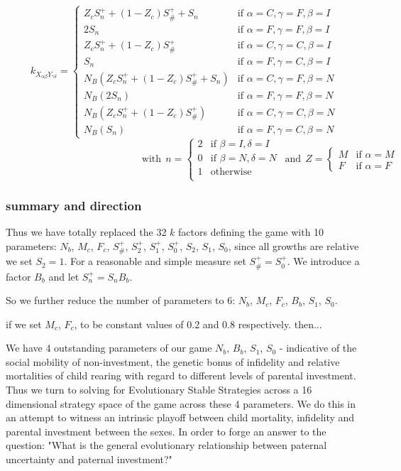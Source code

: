 \documentclass[journal,article,accept,oneauthors,pdftex,10pt,a4paper]{mdpi}
\begin{document}
$$ k_{X_{\alpha\beta}Y_{\gamma\delta}} =
\left\{
	\begin{array}{ll}
		Z_cS^+_n+(1-Z_c)S^+_\#+S_n   & \mbox{if } \alpha=C,\gamma=F,\beta=I \\
		2S_n        & \mbox{if } \alpha=F,\gamma=F,\beta=I \\
		Z_cS^+_n+(1-Z_c)S^+_\#       & \mbox{if } \alpha=C,\gamma=C,\beta=I \\
		S_n         & \mbox{if } \alpha=F,\gamma=C,\beta=I \\
		N_B(Z_cS^+_n+(1-Z_c)S^+_\#+S_n)   & \mbox{if } \alpha=C,\gamma=F,\beta=N \\
		N_B(2S_n)        & \mbox{if } \alpha=F,\gamma=F,\beta=N \\
		N_B(Z_cS^+_n+(1-Z_c)S^+_\#)       & \mbox{if } \alpha=C,\gamma=C,\beta=N \\
		N_B(S_n)         & \mbox{if } \alpha=F,\gamma=C,\beta=N
	\end{array}
\right.$$ $$\text{ }~~~~~~~~~~~~~~~~~~~~~~~~~~~~~~~~~~~~~~~~~~~~~~~~~~~~~~~~~~~\text{with}~~n= \left\{
	\begin{array}{ll}
		2   & \mbox{if } \beta=I,\delta=I \\
		0   & \mbox{if } \beta=N,\delta=N \\
		1   & \mbox{otherwise }  \\
	\end{array}
\right.~~\text{and}~~Z= \left\{
	\begin{array}{ll}
		M   & \mbox{if } \alpha=M \\
		F   & \mbox{if } \alpha=F 
	\end{array}
\right.$$

\subsubsection{summary and direction}

Thus we have totally replaced the 32 $k$ factors defining the game with 10 parameters: $N_b$, $M_c$, $F_c$, $S^+_\#$, $S^+_2$, $S^+_1$, $S^+_0$, $S_2$, $S_1$, $S_0$,
since all growths are relative we set $S_2=1$. For a reasonable and simple measure set $S^+_\#=S^+_0$. We introduce a factor $B_b$ and let $S^+_n=S_nB_b$.

So we further reduce the number of parameters to 6: $N_b$, $M_c$, $F_c$, $B_b$, $S_1$, $S_0$.

if we set $M_c$, $F_c$, to be constant values of 0.2 and 0.8 respectively. then...

We have 4 outstanding parameters of our game $N_b$, $B_b$, $S_1$, $S_0$ - indicative of the social mobility of non-investment, the genetic bonus of infidelity and relative mortalities of child rearing with regard to different levels of parental investment.
Thus we turn to solving for Evolutionary Stable Strategies across a 16 dimensional strategy space of the game across these 4 parameters.
We do this in an attempt to witness an intrinsic playoff between child mortality, infidelity and parental investment between the sexes.
In order to forge an answer to the question:
"What is the general evolutionary relationship between paternal uncertainty and paternal investment?"
\end{document}
